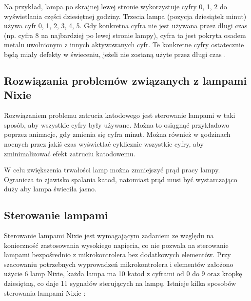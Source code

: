 \documentclass[../main.tex]{subfiles}
\begin{document}
Na przykład, lampa po skrajnej lewej stronie wykorzystuje cyfry 0, 1, 2 do wyświetlania części dziesiętnej godziny.
Trzecia lampa (pozycja dziesiątek minut) używa cyfr 0, 1, 2, 3, 4, 5. Gdy konkretna cyfra nie jest używana przez długi czas
 (np. cyfra 8 na najbardziej po lewej stronie lampy),
cyfra ta jest pokryta osadem metalu uwolnionym z innych aktywowanych cyfr.
 Te konkretne cyfry ostatecznie będą miały defekty w świeceniu, jeżeli nie zostaną użyte przez długi czas \cite{st:nixie1}.

\subsection{Rozwiązania problemów związanych z lampami Nixie}
Rozwiązaniem problemu zatrucia katodowego jest sterowanie lampami w taki sposób, aby wszystkie cyfry były używane.
Można to osiągnąć przykładowo poprzez animacje, gdy zmienia się cyfra minut.
Można również w godzinach nocnych przez jakiś czas wyświetlać cyklicznie wszystkie cyfry, aby zminimalizować efekt zatruciu katodowemu.

W celu zwiększenia trwałości lamp można zmniejszyć prąd pracy lampy. Ogranicza to
 zjawisko spalania katod, natomiast prąd musi być wystarczająco duży aby lampa świeciła jasno.

\subsection{Sterowanie lampami}
\label{sec:sterownie_lampi}

Sterowanie lampami Nixie jest wymagającym zadaniem ze względu na konieczność zastosowania wysokiego napięcia, co nie
pozwala na sterowanie lampami bezpośrednio z mikrokontrolera bez dodatkowych elementów.
Przy szacowaniu potrzebnych wyprowadzeń mikrokontrolera i elementów założono użycie 6 lamp Nixie, każda lampa ma 10 katod z cyframi od 0 do 9 oraz 
kropkę dziesiętną, co daje 11 sygnałów sterujących na lampę.
Istnieje kilka sposobów sterowania lampami Nixie \cite{st:nixie1}:
\end{document}
